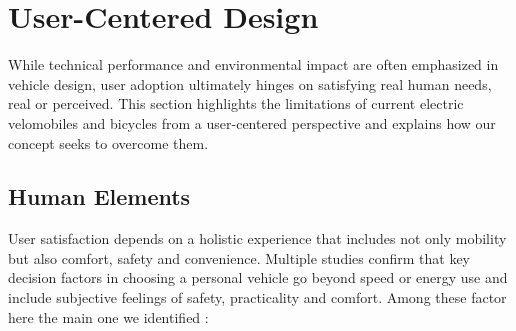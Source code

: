 \section{User-Centered Design}

While technical performance and environmental impact are often emphasized in vehicle design, user adoption ultimately hinges on satisfying real human needs, real or perceived. This section highlights the limitations of current electric velomobiles and bicycles from a user-centered perspective and explains how our concept seeks to overcome them.

\subsection{Human Elements}

User satisfaction depends on a holistic experience that includes not only mobility but also comfort, safety and convenience.
Multiple studies confirm that key decision factors in choosing a personal vehicle go beyond speed or energy use and include subjective feelings of safety, practicality and comfort. Among these factor here the main one we identified :

